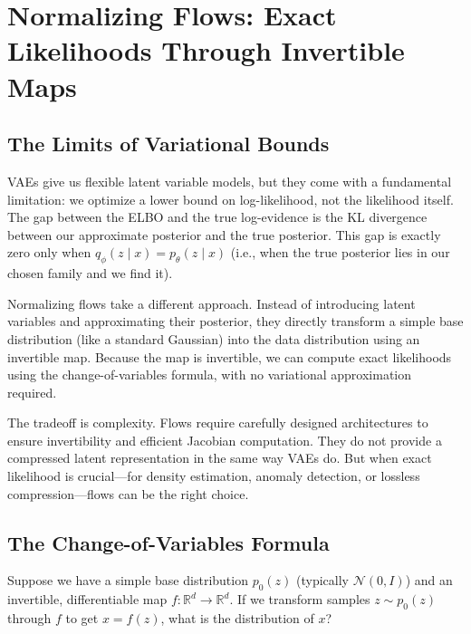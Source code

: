\section{Normalizing Flows: Exact Likelihoods Through Invertible Maps}
\label{sec:flows}

\vspace{1em}

\subsection{The Limits of Variational Bounds}

VAEs give us flexible latent variable models, but they come with a fundamental limitation: we optimize a lower bound on log-likelihood, not the likelihood itself. The gap between the ELBO and the true log-evidence is the KL divergence between our approximate posterior and the true posterior. This gap is exactly zero only when $q_\phi(z\mid x)=p_\theta(z\mid x)$ (i.e., when the true posterior lies in our chosen family and we find it).

\vspace{0.3cm}

Normalizing flows take a different approach. Instead of introducing latent variables and approximating their posterior, they directly transform a simple base distribution (like a standard Gaussian) into the data distribution using an invertible map. Because the map is invertible, we can compute exact likelihoods using the change-of-variables formula, with no variational approximation required.

\vspace{0.3cm}

The tradeoff is complexity. Flows require carefully designed architectures to ensure invertibility and efficient Jacobian computation. They do not provide a compressed latent representation in the same way VAEs do. But when exact likelihood is crucial---for density estimation, anomaly detection, or lossless compression---flows can be the right choice.

\vspace{1.5em}

\subsection{The Change-of-Variables Formula}

Suppose we have a simple base distribution $p_0(z)$ (typically $\mathcal{N}(0, I)$) and an invertible, differentiable map $f: \mathbb{R}^d \to \mathbb{R}^d$. If we transform samples $z \sim p_0(z)$ through $f$ to get $x = f(z)$, what is the distribution of $x$?

